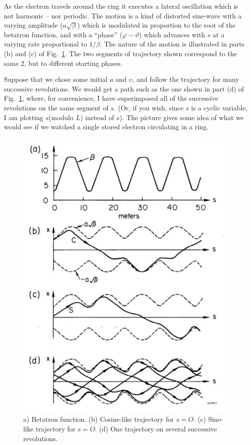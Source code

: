 As the electron travels around the ring it executes a lateral oscillation which is not harmonic -- nor periodic. The motion is a kind of distorted sine-wave with a varying amplitude ($a\sqrt{\beta}$) which is modulated in proportion to the root of the betatron function, and with a “phase” ($\varphi-\vartheta$) which advances with $s$ at a varying rate proportional to $1/\beta$. The nature of the motion is illustrated in parts (b) and (c) of Fig.~\ref{fig:fig12}. The two segments of trajectory shown correspond to the same 2, but to different starting phases.

Suppose that we chose some initial $a$ and $\upsilon$, and follow the trajectory for many successive revolutions. We would get a path such as the one shown in part (d) of Fig.~\ref{fig:fig12}, where, for convenience, I have superimposed all of the successive revolutions on the same segment of $s$. (Or, if you wish, since $s$ is a cyclic variable, I am plotting $s$(modulo $L$) instead of $s$). The picture gives some idea of what we would see if we watched a single stored electron circulating in a ring.

\begin{figure}[!htb]
	\centering
	\includegraphics[width=0.7\linewidth]{./Figuras/fig12.jpeg}
	\caption{a) Betatron function. (b) Cosine-like trajectory for $s=O$. (c) Sine-like trajectory for $s=O$. (d) One trajectory on several successive revolutions.}
	\label{fig:fig12}
\end{figure}

